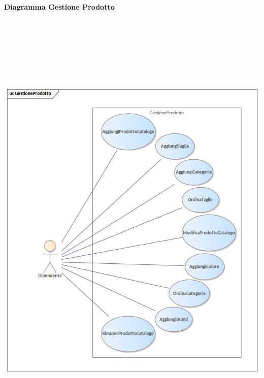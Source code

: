 \newpage\paragraph{Diagramma Gestione Prodotto}\mbox{}\\
\begin{center}
  \includegraphics[width=\textwidth, height=20cm, keepaspectratio]{immagini/GestioneDeiRequisiti/GestioneProdotto.png}
\end{center}

\newpage
